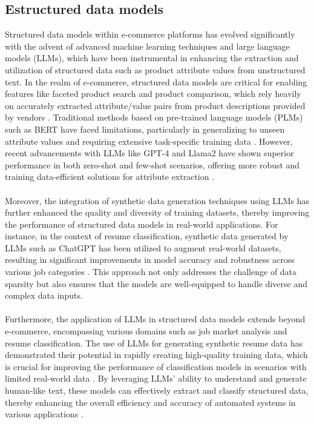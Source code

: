 \subsection*{Estructured data models}
Structured data models within e-commerce platforms has evolved significantly with the advent of advanced machine learning techniques and large language models (LLMs), which have been instrumental in enhancing the extraction and utilization of structured data such as product attribute values from unstructured text. In the realm of e-commerce, structured data models are critical for enabling features like faceted product search and product comparison, which rely heavily on accurately extracted attribute/value pairs from product descriptions provided by vendors \cite{brinkmann2024product}. Traditional methods based on pre-trained language models (PLMs) such as BERT have faced limitations, particularly in generalizing to unseen attribute values and requiring extensive task-specific training data \cite{brinkmann2024product}. However, recent advancements with LLMs like GPT-4 and Llama2 have shown superior performance in both zero-shot and few-shot scenarios, offering more robust and training data-efficient solutions for attribute extraction \cite{brinkmann2024product}. 
\\\\
Moreover, the integration of synthetic data generation techniques using LLMs has further enhanced the quality and diversity of training datasets, thereby improving the performance of structured data models in real-world applications. For instance, in the context of resume classification, synthetic data generated by LLMs such as ChatGPT has been utilized to augment real-world datasets, resulting in significant improvements in model accuracy and robustness across various job categories \cite{skondras2023generating}. This approach not only addresses the challenge of data sparsity but also ensures that the models are well-equipped to handle diverse and complex data inputs. 
\\\\
Furthermore, the application of LLMs in structured data models extends beyond e-commerce, encompassing various domains such as job market analysis and resume classification. The use of LLMs for generating synthetic resume data has demonstrated their potential in rapidly creating high-quality training data, which is crucial for improving the performance of classification models in scenarios with limited real-world data \cite{skondras2023generating}. By leveraging LLMs' ability to understand and generate human-like text, these models can effectively extract and classify structured data, thereby enhancing the overall efficiency and accuracy of automated systems in various applications \cite{tang2024strucbench}.


